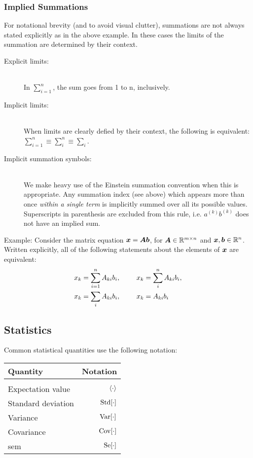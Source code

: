 \documentclass[Thesis.tex]{subfiles}
\begin{document}
\subsubsection{Implied Summations}

For notational brevity (and to avoid visual clutter), summations are not always
stated explicitly as in the above example. In these cases the limits of the
summation are determined by their context.

\begin{description}
\item[Explicit limits:] \hfill\\
  In $\sum_{i=1}^n$, the sum goes from 1 to n, inclusively.
\item[Implicit limits:]\hfill\\
  When limits are clearly defied by their context, the following is equivalent:
  $\sum_{i=1}^n \equiv \sum_{i}^n\equiv \sum_i$.
\item[Implicit summation symbols:]\hfill\\
  We make heavy use of the Einstein summation convention when this is
  appropriate. Any summation index (see above) which appears more than once \emph{within
  a single term} is implicitly summed over all its possible values.
  Superscripts in parenthesis are excluded from this rule, i.e. $a^{(k)}b^{(k)}$
  does not have an implied sum.
\end{description}

Example: Consider the matrix equation $\bm{x} = \bm{A}\bm{b}$, for
$\bm{A}\in\mathbb{R}^{m\times n}$ and $\bm{x}, \bm{b} \in \mathbb{R}^n$. Written
explicitly, all of the following statements about the elements of $\bm{x}$ are equivalent:
\begin{align}
  \begin{split}
  x_k &= \sum_{i=1}^n A_{ki}b_i,\qq{ } x_k = \sum_{i}^n A_{ki}b_i,\\
  x_k &= \sum_{i} A_{ki}b_i,\qq{ } x_k = A_{ki}b_i
  \end{split}
\end{align}

\subsection{Statistics}

Common statistical quantities use the following notation:
\begin{center}
\begin{tabular}{lr}
  Quantity & Notation\\
  \hline\\
  Expectation value & $\expval{\cdot}$ \\
  Standard deviation & $\operatorname{Std}[\cdot]$\\
  Variance & $\operatorname{Var}[\cdot]$\\
  Covariance & $\operatorname{Cov}[\cdot]$\\
  \gls{sem} & $\operatorname{Se}[\cdot]$\\
\end{tabular}
\end{center}
\end{document}
